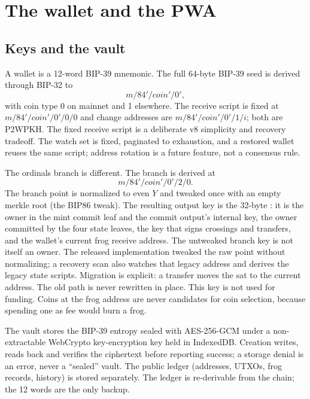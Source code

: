 \section{The wallet and the PWA}\label{sec:wallet}

\subsection{Keys and the vault}

A wallet is a 12-word BIP-39 mnemonic. The full 64-byte BIP-39 seed is
derived through BIP-32 to
\begin{equation}
m/84'/\mathit{coin}'/0',
\end{equation}
with coin type 0 on mainnet and 1 elsewhere. The receive script is fixed at
$m/84'/\mathit{coin}'/0'/0/0$ and change addresses are
$m/84'/\mathit{coin}'/0'/1/i$; both are P2WPKH. The fixed receive script is a
deliberate v8 simplicity and recovery tradeoff. The watch set is fixed,
paginated to exhaustion, and a restored wallet reuses the same script;
address rotation is a future feature, not a consensus rule.

The ordinals branch is different. The branch is derived at
\begin{equation}
m/84'/\mathit{coin}'/0'/2/0.
\end{equation}
The branch point is normalized to even $Y$ and tweaked once with an empty
merkle root (the BIP86 \cite{bip86} tweak). The resulting output key is the
32-byte : it is the owner in the mint commit leaf and the commit
output's internal key, the owner committed by the four state leaves, the key
that signs crossings and transfers, and the wallet's current frog receive
address. The untweaked branch key is not itself an owner. The released
implementation tweaked the raw point without normalizing; a recovery scan
also watches that legacy address and derives the legacy state scripts.
Migration is explicit: a  transfer moves the sat to
the current address. The old path is never rewritten in place. This key is
not used for funding. Coins at the frog address are never candidates for coin
selection, because spending one as fee would burn a frog.

The vault stores the BIP-39 entropy sealed with AES-256-GCM under a
non-extractable WebCrypto key-encryption key held in IndexedDB. Creation
writes, reads back and verifies the ciphertext before reporting success; a
storage denial is an error, never a ``sealed'' vault. The public ledger
(addresses, UTXOs, frog records, history) is stored separately. The ledger is
re-derivable from the chain; the 12 words are the only backup.

